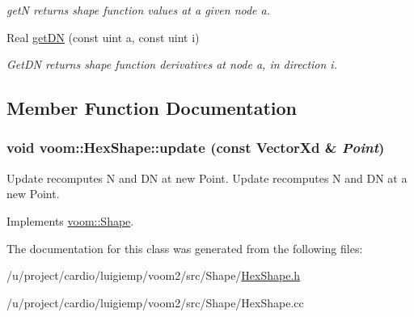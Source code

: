 \begin{DoxyCompactItemize}
\begin{DoxyCompactList}\small\item\em getN returns shape function values at a given node a. \item\end{DoxyCompactList}\item 
\hypertarget{classvoom_1_1_hex_shape_afdb11f3450c7b92608bbe8332961032d}{
Real \hyperlink{classvoom_1_1_hex_shape_afdb11f3450c7b92608bbe8332961032d}{getDN} (const uint a, const uint i)}
\label{classvoom_1_1_hex_shape_afdb11f3450c7b92608bbe8332961032d}

\begin{DoxyCompactList}\small\item\em GetDN returns shape function derivatives at node a, in direction i. \item\end{DoxyCompactList}\end{DoxyCompactItemize}


\subsection{Member Function Documentation}
\hypertarget{classvoom_1_1_hex_shape_a62e0194dcc933cede6fcde41e9cfcd1f}{
\subsubsection[{update}]{\setlength{\rightskip}{0pt plus 5cm}void voom::HexShape::update (const VectorXd \& {\em Point})}}
\label{classvoom_1_1_hex_shape_a62e0194dcc933cede6fcde41e9cfcd1f}


Update recomputes N and DN at new Point. Update recomputes N and DN at a new Point. 

Implements \hyperlink{classvoom_1_1_shape_a8ded544de12647543b056cec61be9f26}{voom::Shape}.

The documentation for this class was generated from the following files:\begin{DoxyCompactItemize}
\item 
/u/project/cardio/luigiemp/voom2/src/Shape/\hyperlink{_hex_shape_8h}{HexShape.h}\item 
/u/project/cardio/luigiemp/voom2/src/Shape/HexShape.cc\end{DoxyCompactItemize}
